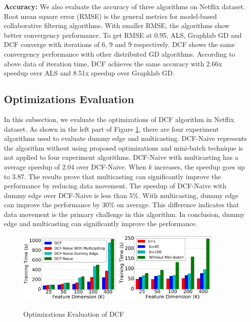 \documentclass{llncs}
\begin{document}
\textbf{Accuracy:} We also evaluate the accuracy of three algorithms on Netflix dataset. Root mean square error (RMSE) \cite{towards} is the general metrics for model-based collaborative filtering algorithms. With smaller RMSE, the algorithms show better convergency performance. To get RMSE at 0.95, ALS, Graphlab GD and DCF converge with iterations of 6, 9 and 9 respectively. DCF shows the same convergency performance with other distributed GD algorithms. According to above data of iteration time, DCF achieves the same accuracy with 2.66x speedup over ALS and 8.51x speedup over Graphlab GD.

\vspace{-15pt}
\subsection{Optimizations Evaluation}
\vspace{-5pt}
\label{sub:opt}

In this subsection, we evaluate the optimizations of DCF algorithm in Netflix dataset. As shown in the left part of Figure \ref{fig:opt}, there are four experiment algorithms used to evaluate dummy edge and multicasting. DCF-Naive represents the algorithm without using proposed optimizations and mini-batch technique is not applied to four experiment algorithms. DCF-Naive with multicasting has a average speedup of 2.04 over DCF-Naive. When $k$ increases, the speedup goes up to 3.87. The results prove that multicasting can significantly improve the performance by reducing data movement. The speedup of DCF-Naive with dummy edge over DCF-Naive is less than 5\%. With multicasting, dummy edge can improve the performance by 30\% on average. This difference indicates that data movement is the primary challenge in this algorithm. In conclusion, dummy edge and multicasting can significantly improve the performance.


\begin{figure}[!t]
\centering
\includegraphics[width=2in]{pics/opt.pdf}
\includegraphics[width=2in]{pics/mb.pdf}
\vspace{-10pt}
\caption{Optimizations Evaluation of DCF}
\vspace{-5pt}
\label{fig:opt}
\end{figure}
\end{document}
